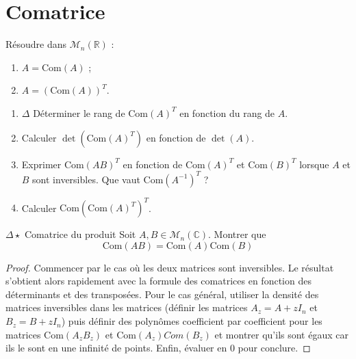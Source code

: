 \documentclass[french,a4paper]{article}
\newcommand{\R}{\mathbb{R}}
\newcommand{\C}{\mathbb{C}}
\newcommand{\inv}{^{-1}}
\theoremstyle{plain}
\theoremstyle{definition}
\theoremstyle{remark}
\begin{document}
\section{Comatrice}

\begin{ex}{}
	Résoudre dans $\mathcal{M}_n(\R)$ : 
	\begin{enumerate}
		\item $A=\text{Com}(A)$ ;
		\item $A=(\text{Com}(A))^T$.
	\end{enumerate}
\end{ex}

\begin{ex}{}
	\begin{enumerate}
		\item $\Delta$ Déterminer le rang de $\text{Com}(A)^T$ en fonction du rang de $A$.
		\item Calculer $\det(\text{Com}(A)^T)$ en fonction de $\det(A)$.
		\item Exprimer $\text{Com}(AB)^T$ en fonction de $\text{Com}(A)^T$ et $\text{Com}(B)^T$ lorsque $A$ et $B$ sont inversibles. Que vaut $\text{Com}(A\inv)^T$ ?
		\item Calculer $\text{Com}(\text{Com}(A)^T)^T$.
	\end{enumerate}
\end{ex}

\begin{ex}{$\Delta\star$ Comatrice du produit}
	Soit $A, B \in \mathcal{M}_n(\C)$. Montrer que $$\text{Com}(AB)=\text{Com}(A)\text{Com}(B)$$
\end{ex}
\begin{proof}
	Commencer par le cas où les deux matrices sont inversibles. Le résultat s'obtient alors rapidement avec la formule des comatrices en fonction des déterminants et des transposées. Pour le cas général, utiliser la densité des matrices inversibles dans les matrices (définir les matrices $A_z=A+zI_n$ et $B_z=B+zI_n$) puis définir des polynômes coefficient par coefficient pour les matrices $\text{Com}(A_z B_z)$ et $\text{Com}(A_z)Com(B_z)$ et montrer qu'ils sont égaux car ils le sont en une infinité de points. Enfin, évaluer en 0 pour conclure.
\end{proof}
\end{document}
